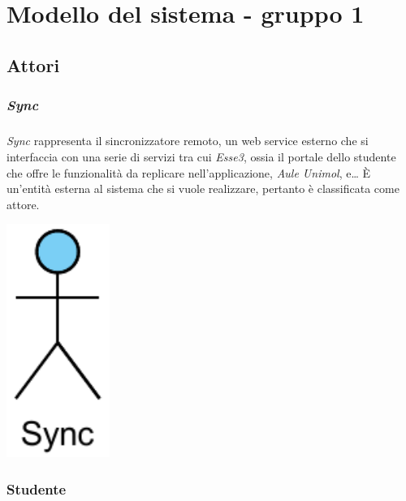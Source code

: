 
\chapter{Modello del sistema - gruppo 1}
\label{ref:modSistemaGruppo1}


\section{Attori}
\subsection{\textit{Sync}}
\paragraph{} 
\textit{Sync} rappresenta il sincronizzatore remoto, un web service esterno che si interfaccia con una serie di servizi tra cui \textit{Esse3}, ossia il portale dello studente che offre le funzionalità da replicare nell’applicazione, \textit{Aule Unimol}, e… È un’entità esterna al sistema che si vuole realizzare, pertanto  è classificata come attore.
\begin{center}
	\includegraphics[height=3in]{imgs/gruppo1/Attore-Sync.pdf}
\end{center}

\subsection{Studente}
